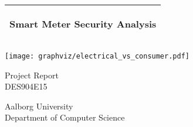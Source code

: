 %
%
%
%
%
\begin{titlepage}
  \addtolength{\hoffset}{0.5\evensidemargin-0.5\oddsidemargin} %
  \noindent%
  \begin{tabular}{@{}p{\textwidth}@{}}
    \toprule[2pt]
    \midrule
    \vspace{0.2cm}
    \begin{center}
    \Huge{\textbf{
      Smart Meter Security Analysis%
    }}
    \end{center}
    \vspace{0.2cm}\\
    \midrule
    \toprule[2pt]
  \end{tabular}
  \vspace{1 cm}
  \begin{center}
    \hspace*{-1.5cm}\texttt{[image: graphviz/electrical\_vs\_consumer.pdf]}
  \end{center}
  \vfill
  \begin{center}
    {\large
      Project Report%
    }\\
    \vspace{0.2cm}
    {\Large
      DES904E15%
    }
  \end{center}
  \begin{center}
  Aalborg University\\
  Department of Computer Science
  \end{center}
\end{titlepage}
\clearpage

